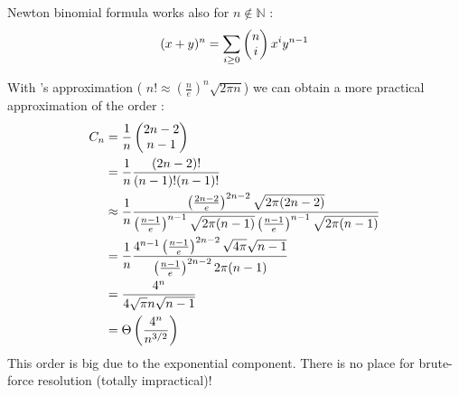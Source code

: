 \begin{theorem} \label{cm4:newton}
Newton binomial formula works also for $n\not\in \mathbb{N}$ : $$(x+y)^n = \sum_{i\geq 0} \left( \begin{matrix} n\\ i\end{matrix} \right) x^i y^{n-1}$$
\end{theorem}

With 's approximation (
$n! \approx \left(\frac{n}{e}\right)^n \sqrt{2\pi n}$) we can obtain a more practical approximation of the order : 
\begin{align*}
C_n &= \frac{1}{n}\left( \begin{matrix} 2n-2\\ n-1\end{matrix} \right)\\
&= \frac{1}{n} \frac{(2n-2)!}{(n-1)!(n-1)!}\\
&\approx \frac{1}{n} \frac{\left(\frac{2n-2}{e}\right)^{2n-2} \sqrt{2\pi (2n-2)}}{\left(\frac{n-1}{e}\right)^{n-1} \sqrt{2\pi (n-1)}\left(\frac{n-1}{e}\right)^{n-1} \sqrt{2\pi (n-1)}}\\
&=\frac{1}{n} \frac{4^{n-1}\left(\frac{n-1}{e}\right)^{2n-2}\sqrt{4\pi}\sqrt{n-1}}{\left(\frac{n-1}{e}\right)^{2n-2}2\pi (n-1)}\\
&=\frac{4^n}{4\sqrt{\pi} n\sqrt{n-1}}\\
&= \Theta \left(\frac{4^n}{n^{3/2}}\right)
\end{align*}
This order is big due to the exponential component. There is no place for brute-force resolution (totally impractical)!